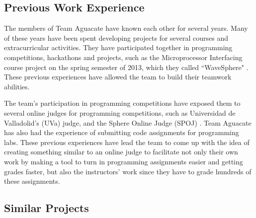 
\subsection{Previous Work Experience}

The members of Team Aguacate have known each other for several years. Many of
these years have been spent developing projects for several courses and
extracurricular activities. They have participated together in programming
competitions, hackathons and projects, such as the Microprocessor Interfacing
course project on the spring semester of 2013, which they called ``WaveSphere"
\cite{Micro2}. These previous experiences have allowed the team to build their
teamwork abilities.

The team's participation in programming competitions have exposed them to
several  online judges for programming competitions, such as Universidad de
Valladolid's (UVa) judge, \cite{UVA} and the Sphere Online Judge (SPOJ)
\cite{SPOJ}. Team Aguacate has also had the experience of submitting code
assignments for programming labs. These previous experiences have lead the team
to come up with the idea of creating something similar to an online judge to
facilitate not only their own work by making a tool to turn in programming
assignments easier and getting grades faster, but also the instructors' work
since they have to grade hundreds of these assignments.

\subsection{Similar Projects}

